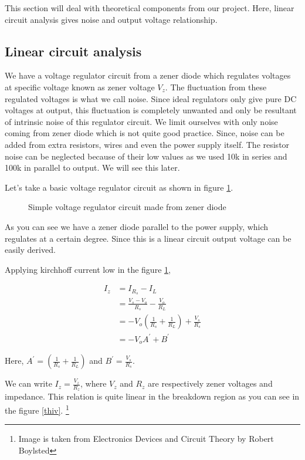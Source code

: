 This section will deal with theoretical components from our project. Here, linear circuit analysis gives noise and output voltage relationship. 

\subsection{Linear circuit analysis \label{lca}}


We have a voltage regulator circuit from a zener diode which regulates voltages at specific voltage known as zener voltage $V_{z}$. The fluctuation from these regulated voltages is what we call noise. Since ideal regulators only give pure DC voltages at output, this fluctuation is completely unwanted and only be resultant of intrinsic noise of this regulator circuit.  We limit ourselves with only noise coming from zener diode which is not quite good practice. Since, noise can be added from extra resistors, wires and even the power supply itself. The resistor noise can be neglected because of their low values as we used 10k in series and 100k in parallel to output. We will see this later.

Let’s take a basic voltage regulator circuit as shown in figure \ref{thcir1}.

\begin{figure}[hbt!]
\caption{Simple voltage regulator circuit made from zener diode \label{thcir1}}
\end{figure}

As you can see we have a zener diode parallel to the power supply, which regulates at a certain degree. Since this is a linear circuit output voltage can be easily derived.

Applying kirchhoff current low in the figure \ref{thcir1},


\begin{align*}
I_{z} & = I_{R_s} -I_{L}\\
& = \frac{V_s-V_o}{R_s}-\frac{V_o}{R_L}\\
& = -V_o(\frac{1}{R_s}+\frac{1}{R_L})+ \frac{V_s}{R_s}\\
& = -V_oA^{\prime}+B^{\prime}
\end{align*}

Here, $A^{\prime} = (\frac{1}{R_s}+\frac{1}{R_L})$ and $B^{\prime} = \frac{V_s}{R_s}$.  

We can write $I_z = \frac{V_z}{R_z}$, where $V_z$ and $R_z$ are respectively zener voltages and impedance.  This relation is quite linear in the breakdown region as you can see in the figure \ref{thiv}. \footnote{Image is taken from Electronics Devices and Circuit Theory by Robert Boylsted}

